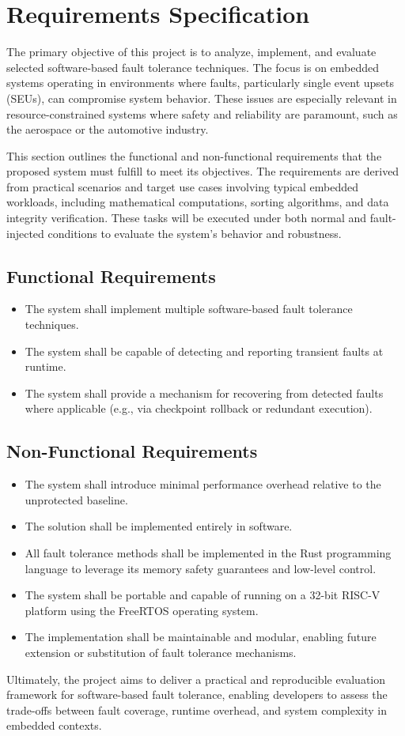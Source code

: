 \clearpage
\section{Requirements Specification}

The primary objective of this project is to analyze, implement, and evaluate selected software-based fault tolerance techniques. The focus is on embedded systems operating in environments where faults, particularly single event upsets (SEUs), can compromise system behavior. These issues are especially relevant in resource-constrained systems where safety and reliability are paramount, such as the aerospace or the automotive industry.

This section outlines the functional and non-functional requirements that the proposed system must fulfill to meet its objectives. The requirements are derived from practical scenarios and target use cases involving typical embedded workloads, including mathematical computations, sorting algorithms, and data integrity verification. These tasks will be executed under both normal and fault-injected conditions to evaluate the system's behavior and robustness.

\subsection*{Functional Requirements}
\begin{itemize}
\item The system shall implement multiple software-based fault tolerance techniques.
\item The system shall be capable of detecting and reporting transient faults at runtime.
\item The system shall provide a mechanism for recovering from detected faults where applicable (e.g., via checkpoint rollback or redundant execution).
\end{itemize}

\subsection*{Non-Functional Requirements}
\begin{itemize}
\item The system shall introduce minimal performance overhead relative to the unprotected baseline.
\item The solution shall be implemented entirely in software.
\item All fault tolerance methods shall be implemented in the Rust programming language to leverage its memory safety guarantees and low-level control.
\item The system shall be portable and capable of running on a 32-bit RISC-V platform using the FreeRTOS operating system.
\item The implementation shall be maintainable and modular, enabling future extension or substitution of fault tolerance mechanisms.
\end{itemize}

Ultimately, the project aims to deliver a practical and reproducible evaluation framework for software-based fault tolerance, enabling developers to assess the trade-offs between fault coverage, runtime overhead, and system complexity in embedded contexts.